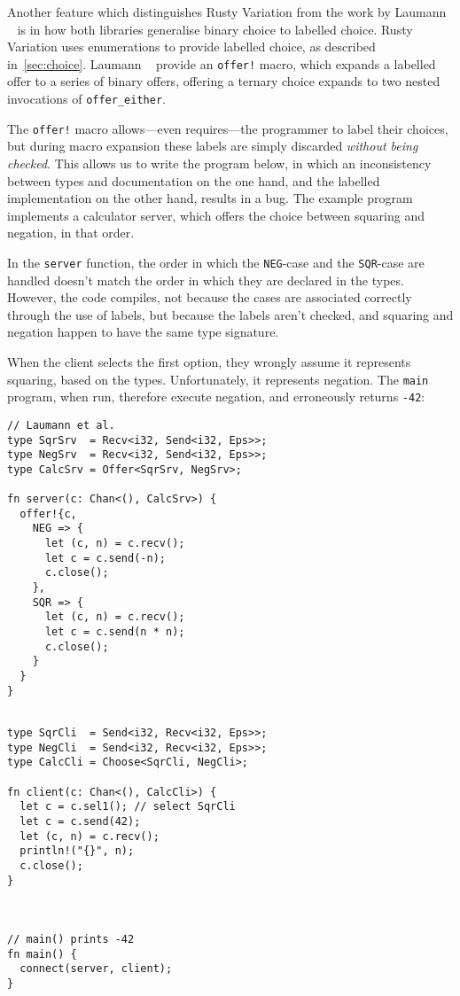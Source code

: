 \documentclass[copyright,creativecommons]{eptcs}
\begin{document}
Another feature which distinguishes Rusty Variation from the work by Laumann \etal~\cite{jespersen2015} is in how both libraries generalise binary choice to labelled choice. Rusty Variation uses enumerations to provide labelled choice, as described in~\cref{sec:choice}. Laumann \etal~\cite{jespersen2015} provide an \lstinline{offer!} macro, which expands a labelled offer to a series of binary offers, \eg offering a ternary choice expands to two nested invocations of \lstinline{offer_either}.

The \lstinline{offer!} macro allows---even requires---the programmer to label their choices, but during macro expansion these labels are simply discarded \emph{without being checked}. This allows us to write the program below, in which an inconsistency between types and documentation on the one hand, and the labelled implementation on the other hand, results in a bug. The example program implements a calculator server, which offers the choice between squaring and negation, in that order.

In the \lstinline{server} function, the order in which the \lstinline{NEG}-case and the \lstinline{SQR}-case are handled doesn't match the order in which they are declared in the types. However, the code compiles, not because the cases are associated correctly through the use of labels, but because the labels aren't checked, and squaring and negation happen to have the same type signature.

When the client selects the first option, they wrongly assume it represents squaring, based on the types. Unfortunately, it represents negation. The \lstinline{main} program, when run, therefore execute negation, and erroneously returns \lstinline{-42}:

\vspace{-0.5\baselineskip}
\begin{minipage}[t]{0.5\linewidth}
\begin{lstlisting}
// Laumann et al.
type SqrSrv  = Recv<i32, Send<i32, Eps>>;
type NegSrv  = Recv<i32, Send<i32, Eps>>;
type CalcSrv = Offer<SqrSrv, NegSrv>;

fn server(c: Chan<(), CalcSrv>) {
  offer!{c,
    NEG => {
      let (c, n) = c.recv();
      let c = c.send(-n);
      c.close();
    },
    SQR => {
      let (c, n) = c.recv();
      let c = c.send(n * n);
      c.close();
    }
  }
}
\end{lstlisting}
\end{minipage}%
\begin{minipage}[t]{0.5\linewidth}
\begin{lstlisting}

type SqrCli  = Send<i32, Recv<i32, Eps>>;
type NegCli  = Send<i32, Recv<i32, Eps>>;
type CalcCli = Choose<SqrCli, NegCli>;

fn client(c: Chan<(), CalcCli>) {
  let c = c.sel1(); // select SqrCli
  let c = c.send(42);
  let (c, n) = c.recv();
  println!("{}", n);
  c.close();
}



// main() prints -42
fn main() {
  connect(server, client);
}
\end{lstlisting}
\end{minipage}
\end{document}
